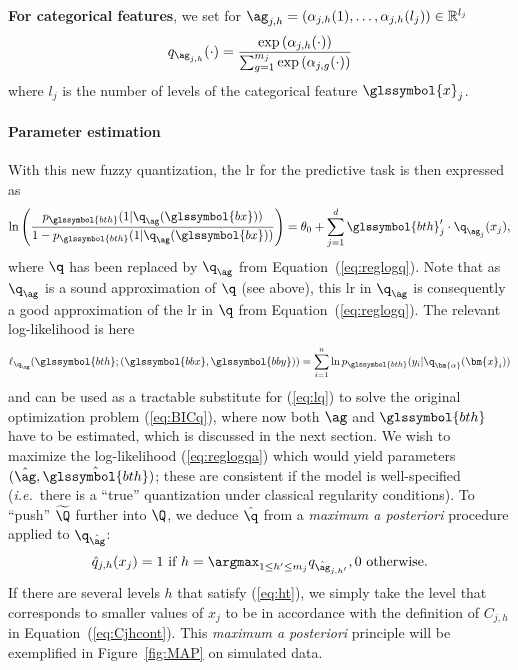 {\bf For categorical features}, we set for $\ag_{j,h}=\left(\alpha_{j,h}(1),\ldots, \alpha_{j,h}(l_j)\right) \in \mathbb{R}^{l_j}$
\[q_{\ag_{j,h}}(\cdot) = \frac{\exp\left(\alpha_{j,h}(\cdot)\right)}{\sum_{g=1}^{m_j} \exp\left(\alpha_{j,g}(\cdot)\right)}\]
where $l_j$ is the number of levels of the categorical feature $\glssymbol{x}_j$.

\paragraph{Parameter estimation}

With this new fuzzy quantization, the \gls{lr} for the predictive task is then expressed as
\begin{equation}
    \label{eq:reglogqa}
    \ln \left( \dfrac{p_{\glssymbol{bth}}(1|\q_{\ag} (\glssymbol{bx}))}{1 - p_{\glssymbol{bth}}(1|\q_{\ag} (\glssymbol{bx}))} \right) = \theta_0 + \sum_{j=1}^d {\glssymbol{bth}_j' \cdot \q_{\ag_{j}}(x_j)},
\end{equation}
where $\q$ has been replaced by $\q_{\ag}$ from Equation~(\ref{eq:reglogq}).
Note that as $\q_{\ag}$ is a sound approximation of $\q$ (see above), this \gls{lr} in $\q_{\ag}$ is consequently a good approximation of the \gls{lr} in $\q$ from Equation~(\ref{eq:reglogq}). The relevant log-likelihood is here 
\begin{equation}
    \label{eq:lqa}
    \ell_{\q_{\ag}}(\glssymbol{bth} ; (\glssymbol{bbx},\glssymbol{bby}))=\sum_{i=1}^n \ln p_{\glssymbol{bth}}(y_i|\q_{\bm{\alpha}}(\bm{x}_i))
\end{equation}
and can be used as a tractable substitute for (\ref{eq:lq}) to solve the original optimization problem (\ref{eq:BICq}), where now both $\ag$ and $\glssymbol{bth}$ have to be estimated, which is discussed in the next section. We wish to maximize the log-likelihood (\ref{eq:reglogqa}) which would yield parameters $(\hat{\ag},\hat{\glssymbol{bth}})$; these are consistent if the model is well-specified (\textit{i.e.}\ there is a ``true'' quantization under classical regularity conditions). To ``push'' $\widetilde{\Q}$ further into $\Q$, we deduce $\hat{\q}$ from a \textit{maximum a posteriori} procedure applied to $\q_{\hat{\ag}}$:
\begin{equation}
    \label{eq:ht}
    \hat{q}_{j,h}(x_j) = 1 \text{ if } h = \argmax_{1 \leq h' \leq m_j} q_{\hat{\ag}_{j,h'}}, 0 \text{ otherwise.}
\end{equation}
If there are several levels $h$ that satisfy (\ref{eq:ht}), we simply take the level that corresponds to smaller values of $x_j$ to be in accordance with the definition of $C_{j,h}$ in Equation~(\ref{eq:Cjhcont}). This {\it maximum a posteriori} principle will be exemplified in Figure~\ref{fig:MAP} on simulated data.



